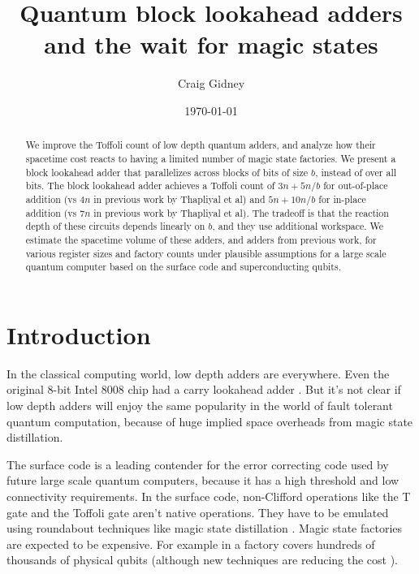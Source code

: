 \documentclass[onecolumn,unpublished]{quantumarticle}
\title{Quantum block lookahead adders and the wait for magic states}
\date{\today}
\author{Craig Gidney}
\affiliation{Google Inc., Santa Barbara, California 93117, USA}
\theoremstyle{definition}
\theoremstyle{definition}
\theoremstyle{definition}
\begin{document}
\maketitle

\begin{abstract}
We improve the Toffoli count of low depth quantum adders, and analyze how their spacetime cost reacts to having a limited number of magic state factories.
We present a block lookahead adder that parallelizes across blocks of bits of size $b$, instead of over all bits.
The block lookahead adder achieves a Toffoli count of $3n + 5n/b$ for out-of-place addition (vs $4n$ in previous work by Thapliyal et al) and $5n + 10n/b$ for in-place addition (vs $7n$ in previous work by Thapliyal et al).
The tradeoff is that the reaction depth of these circuits depends linearly on $b$, and they use additional workspace.
We estimate the spacetime volume of these adders, and adders from previous work, for various register sizes and factory counts under plausible assumptions for a large scale quantum computer based on the surface code and superconducting qubits.
\end{abstract}

\section{Introduction}

In the classical computing world, low depth adders are everywhere.
Even the original 8-bit Intel 8008 chip had a carry lookahead adder \cite{shirriff2020reverseengineer8008}.
But it's not clear if low depth adders will enjoy the same popularity in the world of fault tolerant quantum computation, because of huge implied space overheads from magic state distillation.

The surface code \cite{fowler2012surfacereview} is a leading contender for the error correcting code used by future large scale quantum computers, because it has a high threshold and low connectivity requirements.
In the surface code, non-Clifford operations like the T gate and the Toffoli gate aren't native operations.
They have to be emulated using roundabout techniques like magic state distillation \cite{bravyi2005magicstate}.
Magic state factories are expected to be expensive.
For example in \cite{gidney2019catalyzed} a factory covers hundreds of thousands of physical qubits (although new techniques are reducing the cost \cite{litinski2019magicnotcostly}).
\end{document}
